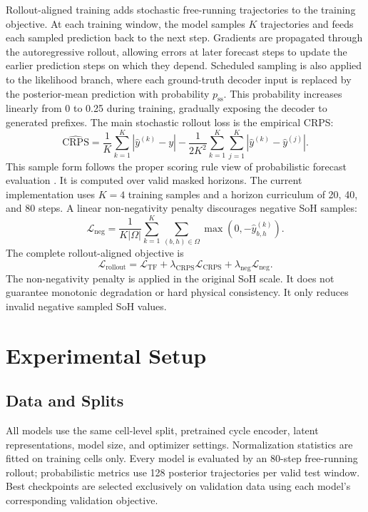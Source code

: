 \documentclass[conference]{IEEEtran}
\begin{document}
Rollout-aligned training adds stochastic free-running trajectories to the
training objective. At each training window, the model samples $K$ trajectories
and feeds each sampled prediction back to the next step. Gradients are
propagated through the autoregressive rollout, allowing errors at later
forecast steps to update the earlier prediction steps on which they depend.
Scheduled sampling is also applied to the likelihood branch, where each
ground-truth decoder input is replaced by the posterior-mean prediction with
probability $p_{\mathrm{ss}}$. This probability increases linearly from 0 to
0.25 during training, gradually exposing the decoder to generated prefixes.
The main stochastic rollout loss is the empirical CRPS:
\begin{equation}
\widehat{\mathrm{CRPS}}
=
\frac{1}{K}\sum_{k=1}^{K} |\hat{y}^{(k)}-y|
-
\frac{1}{2K^2}\sum_{k=1}^{K}\sum_{j=1}^{K}
|\hat{y}^{(k)}-\hat{y}^{(j)}|.
\label{eq:empirical-crps}
\end{equation}
This sample form follows the proper scoring rule view of probabilistic
forecast evaluation \cite{gneiting2007scoring}. It is computed over valid
masked horizons. The current implementation uses $K=4$ training samples and
a horizon curriculum of 20, 40, and 80 steps. A
linear non-negativity penalty discourages negative SoH samples:
\begin{equation}
\mathcal{L}_{\mathrm{neg}}
=
\frac{1}{K|\Omega|}
\sum_{k=1}^{K}\sum_{(b,h)\in\Omega}
\max(0,-\hat{y}_{b,h}^{(k)}).
\end{equation}
The complete rollout-aligned objective is
\begin{equation}
\mathcal{L}_{\mathrm{rollout}}
=
\mathcal{L}_{\mathrm{TF}}
+ \lambda_{\mathrm{CRPS}}\mathcal{L}_{\mathrm{CRPS}}
+ \lambda_{\mathrm{neg}}\mathcal{L}_{\mathrm{neg}}.
\end{equation}
The non-negativity penalty is applied in the original SoH scale. It does not
guarantee monotonic degradation or hard physical consistency. It only reduces
invalid negative sampled SoH values.

\section{Experimental Setup}

\subsection{Data and Splits}

All models use the same cell-level split, pretrained cycle encoder, latent
representations, model size, and optimizer settings. Normalization statistics
are fitted on training cells only. Every model is evaluated by an 80-step
free-running rollout; probabilistic metrics use 128 posterior trajectories per
valid test window. Best checkpoints are selected exclusively on validation
data using each model's corresponding validation objective.
\end{document}
